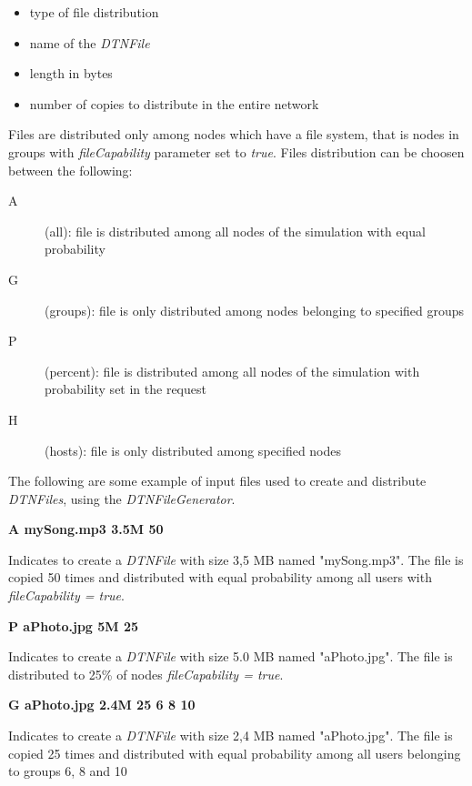 \begin{itemize}
\item type of file distribution 
\item name of the \textit{DTNFile}
\item length in bytes
\item number of copies to distribute in the entire network
\end{itemize}

Files are distributed only among nodes which have a file system, that is nodes in groups with \textit{fileCapability} parameter set to \textit{true}. Files distribution can be choosen between the following:

\begin{description}
\item[A] (all): file is distributed among all nodes of the simulation with equal probability
\item[G] (groups): file is only distributed among nodes belonging to specified groups
\item[P] (percent): file is distributed among all nodes of the simulation with probability set in the request
\item[H] (hosts): file is only distributed among specified nodes  
\end{description}

The following are some example of input files used to create and distribute \textit{DTNFiles}, using the \textit{DTNFileGenerator}.

\begin{center}
\textbf{A	mySong.mp3	3.5M	50}
\end{center}
Indicates to create a \textit{DTNFile} with size 3,5 MB named "mySong.mp3". The file is copied 50 times and distributed with equal probability among all users with \textit{fileCapability = true}.
\\

\begin{center}
\textbf{P	aPhoto.jpg	5M	25}
\end{center}
Indicates to create a \textit{DTNFile} with size 5.0 MB named "aPhoto.jpg". The file is distributed to 25\% of nodes \textit{fileCapability = true}.
\\

\begin{center}
\textbf{G	aPhoto.jpg	2.4M	25	6	8	10}
\end{center}
Indicates to create a \textit{DTNFile} with size 2,4 MB named "aPhoto.jpg". The file is copied 25 times and distributed with equal probability among all users belonging to groups 6, 8 and 10
\\

